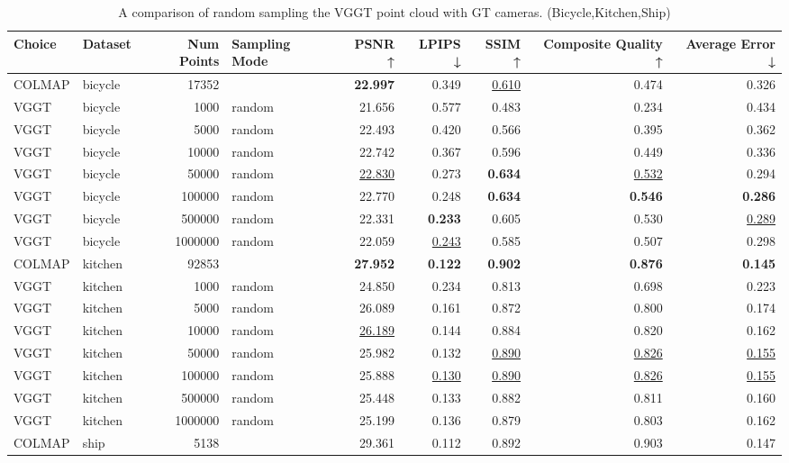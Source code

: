 \begin{table}[H]
\caption{A comparison of random sampling the VGGT point cloud with GT cameras. (Bicycle,Kitchen,Ship)}
\label{tab:03_random_gt_cams_bicycle,kitchen,ship}
\small
\begin{tabular}{llrlrrrrr}
\toprule
Choice & Dataset & Num Points & Sampling Mode & PSNR ↑ & LPIPS ↓ & SSIM ↑ & Composite Quality ↑ & Average Error ↓ \\
\midrule
COLMAP & bicycle & 17352 &  & \textbf{22.997} & 0.349 & \underline{0.610} & 0.474 & 0.326 \\
VGGT & bicycle & 1000 & random & 21.656 & 0.577 & 0.483 & 0.234 & 0.434 \\
VGGT & bicycle & 5000 & random & 22.493 & 0.420 & 0.566 & 0.395 & 0.362 \\
VGGT & bicycle & 10000 & random & 22.742 & 0.367 & 0.596 & 0.449 & 0.336 \\
VGGT & bicycle & 50000 & random & \underline{22.830} & 0.273 & \textbf{0.634} & \underline{0.532} & 0.294 \\
VGGT & bicycle & 100000 & random & 22.770 & 0.248 & \textbf{0.634} & \textbf{0.546} & \textbf{0.286} \\
VGGT & bicycle & 500000 & random & 22.331 & \textbf{0.233} & 0.605 & 0.530 & \underline{0.289} \\
VGGT & bicycle & 1000000 & random & 22.059 & \underline{0.243} & 0.585 & 0.507 & 0.298 \\
\midrule
COLMAP & kitchen & 92853 &  & \textbf{27.952} & \textbf{0.122} & \textbf{0.902} & \textbf{0.876} & \textbf{0.145} \\
VGGT & kitchen & 1000 & random & 24.850 & 0.234 & 0.813 & 0.698 & 0.223 \\
VGGT & kitchen & 5000 & random & 26.089 & 0.161 & 0.872 & 0.800 & 0.174 \\
VGGT & kitchen & 10000 & random & \underline{26.189} & 0.144 & 0.884 & 0.820 & 0.162 \\
VGGT & kitchen & 50000 & random & 25.982 & 0.132 & \underline{0.890} & \underline{0.826} & \underline{0.155} \\
VGGT & kitchen & 100000 & random & 25.888 & \underline{0.130} & \underline{0.890} & \underline{0.826} & \underline{0.155} \\
VGGT & kitchen & 500000 & random & 25.448 & 0.133 & 0.882 & 0.811 & 0.160 \\
VGGT & kitchen & 1000000 & random & 25.199 & 0.136 & 0.879 & 0.803 & 0.162 \\
\midrule
COLMAP & ship & 5138 &  & 29.361 & 0.112 & 0.892 & 0.903 & 0.147 \\

\end{tabular}
\end{table}
